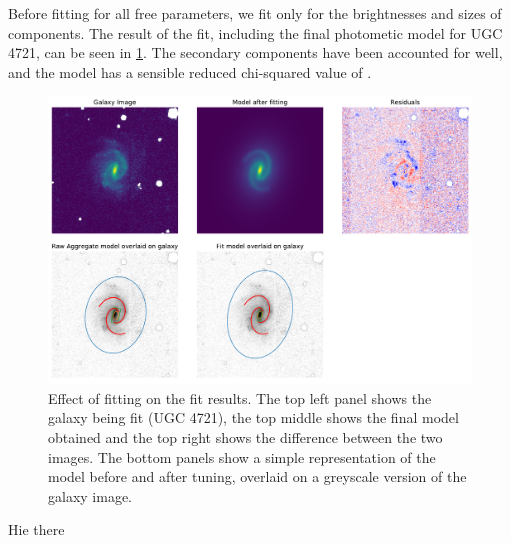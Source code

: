 \documentclass[../main.tex]{subfiles}
\begin{document}
Before fitting for all free parameters, we fit only for the brightnesses and sizes of components. The result of the fit, including the final photometic model for UGC 4721, can be seen in \ref{fig:model_tuning}. The secondary components have been accounted for well, and the model has a sensible reduced chi-squared value of .

\begin{figure}
  \includegraphics[width=17.7cm]{images__method/model_tuning.pdf}
  \caption{Effect of fitting on the fit results. The top left panel shows the galaxy being fit (UGC 4721), the top middle shows the final model obtained and the top right shows the difference between the two images. The bottom panels show a simple representation of the model before and after tuning, overlaid on a greyscale version of the galaxy image.}
  \label{fig:model_tuning}
\end{figure}

Hie there
\end{document}
